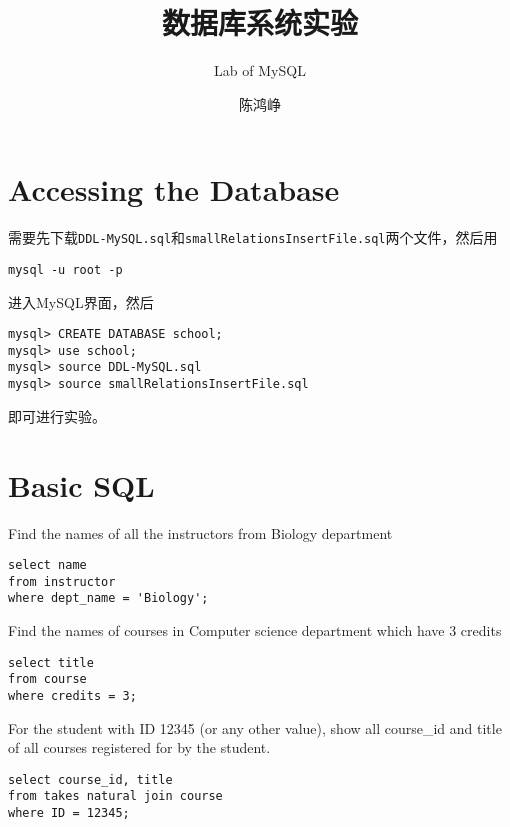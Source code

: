\documentclass[logo,reportComp]{thesis}
\title{数据库系统实验}
\subtitle{Lab of MySQL}
\author{陈鸿峥}
\begin{document}
\maketitle

\section{Accessing the Database}
需要先下载\verb'DDL-MySQL.sql'和\verb'smallRelationsInsertFile.sql'两个文件，然后用
\begin{lstlisting}
mysql -u root -p
\end{lstlisting}
进入MySQL界面，然后
\begin{lstlisting}
mysql> CREATE DATABASE school;
mysql> use school;
mysql> source DDL-MySQL.sql
mysql> source smallRelationsInsertFile.sql
\end{lstlisting}
即可进行实验。

\section{Basic SQL}
\begin{question}
\normalfont Find the names of all the instructors from Biology department
\end{question}
\begin{answer}\mbox{}\par
\begin{lstlisting}
select name
from instructor
where dept_name = 'Biology';
\end{lstlisting}
\end{answer}

\begin{question}
\normalfont 
Find the names of courses in Computer science department which have 3 credits
\end{question}
\begin{answer}\mbox{}\par
\begin{lstlisting}
select title
from course
where credits = 3;
\end{lstlisting}
\end{answer}

\begin{question}
\normalfont 
For the student with ID 12345 (or any other value), show all course\_id and title of all courses registered for by the student.
\end{question}
\begin{answer}\mbox{}\par
\begin{lstlisting}
select course_id, title
from takes natural join course
where ID = 12345;
\end{lstlisting}
\end{answer}
\end{document}
